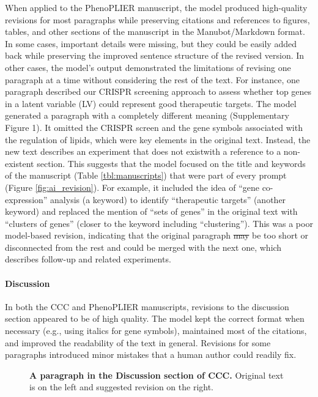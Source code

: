 \documentclass[
]{article}
\providecommand{\DIFaddtex}[1]{{\protect\color{blue}\uwave{#1}}} %
\providecommand{\DIFdeltex}[1]{{\protect\color{red}\sout{#1}}}                      %
\providecommand{\DIFaddbegin}{} %
\providecommand{\DIFaddend}{} %
\providecommand{\DIFdelbegin}{} %
\providecommand{\DIFdelend}{} %
\providecommand{\DIFadd}[1]{\texorpdfstring{\DIFaddtex{#1}}{#1}} %
\providecommand{\DIFdel}[1]{\texorpdfstring{\DIFdeltex{#1}}{}} %
\newcommand{\DIFscaledelfig}{0.5}
\newlength{\DIFdelgraphicswidth} %
\newlength{\DIFdelgraphicsheight} %
\newcommand{\DIFaddincludegraphics}[2][]{{\color{blue}\fbox{\DIFOincludegraphics[#1]{#2}}}} %
\newcommand{\DIFdelincludegraphics}[2][]{%
\sbox{\DIFdelgraphicsbox}{\DIFOincludegraphics[#1]{#2}}%
\settoboxwidth{\DIFdelgraphicswidth}{\DIFdelgraphicsbox} %
\settoboxtotalheight{\DIFdelgraphicsheight}{\DIFdelgraphicsbox} %
\scalebox{\DIFscaledelfig}{%
\parbox[b]{\DIFdelgraphicswidth}{\usebox{\DIFdelgraphicsbox}\\[-\baselineskip] \rule{\DIFdelgraphicswidth}{0em}}\llap{\resizebox{\DIFdelgraphicswidth}{\DIFdelgraphicsheight}{%
\setlength{\unitlength}{\DIFdelgraphicswidth}%
\begin{picture}(1,1)%
\thicklines\linethickness{2pt} %
{\color[rgb]{1,0,0}\put(0,0){\framebox(1,1){}}}%
{\color[rgb]{1,0,0}\put(0,0){\line( 1,1){1}}}%
{\color[rgb]{1,0,0}\put(0,1){\line(1,-1){1}}}%
\end{picture}%
}\hspace*{3pt}}} %
} %
\DeclareRobustCommand{\DIFaddbegin}{\DIFOaddbegin \let\includegraphics\DIFaddincludegraphics} %
\DeclareRobustCommand{\DIFaddend}{\DIFOaddend \let\includegraphics\DIFOincludegraphics} %
\DeclareRobustCommand{\DIFdelbegin}{\DIFOdelbegin \let\includegraphics\DIFdelincludegraphics} %
\DeclareRobustCommand{\DIFdelend}{\DIFOaddend \let\includegraphics\DIFOincludegraphics} %
\begin{document}
When applied to the PhenoPLIER manuscript, the model produced high-quality revisions for most paragraphs while preserving citations and references to figures, tables, and other sections of the manuscript in the Manubot/Markdown format.
In some cases, important details were missing, but they could be easily added back while preserving the improved sentence structure of the revised version.
In other cases, the model's output demonstrated the limitations of revising one paragraph at a time without considering the rest of the text.
For instance, one paragraph described our CRISPR screening approach to assess whether top genes in a latent variable (LV) could represent good therapeutic targets.
The model generated a paragraph with a completely different meaning (Supplementary Figure 1).
It omitted the CRISPR screen and the gene symbols associated with the regulation of lipids, which were key elements in the original text.
Instead, the new text describes an experiment that does not exist\DIFaddbegin \DIFadd{, }\DIFaddend with a reference to a non-existent section.
This suggests that the model focused on the title and keywords of the manuscript (Table \ref{tbl:manuscripts}) that were part of every prompt (Figure \ref{fig:ai_revision}).
For example, it included the idea of ``gene co-expression'' analysis (a keyword) to identify ``therapeutic targets'' (another keyword) and replaced the mention of ``sets of genes'' in the original text with ``clusters of genes'' (closer to the keyword including ``clustering'').
This was a poor model-based revision, indicating that the original paragraph \DIFdelbegin \DIFdel{may }\DIFdelend \DIFaddbegin \DIFadd{might }\DIFaddend be too short or disconnected from the rest and could be merged with the next one, which describes follow-up and related experiments.

\paragraph{Discussion}

In both the CCC and PhenoPLIER manuscripts, revisions to the discussion section appeared to be of high quality.
The model kept the correct format when necessary (e.g., using italics for gene symbols), maintained most of the citations, and improved the readability of the text in general.
Revisions for some paragraphs introduced minor mistakes that a human author could readily fix.

\begin{figure}
\hypertarget{fig:discussion:ccc}{%
\centering

\caption{\textbf{A paragraph in the Discussion section of CCC.}
Original text is on the left and suggested revision on the right.}\label{fig:discussion:ccc}
}
\end{figure}
\end{document}
